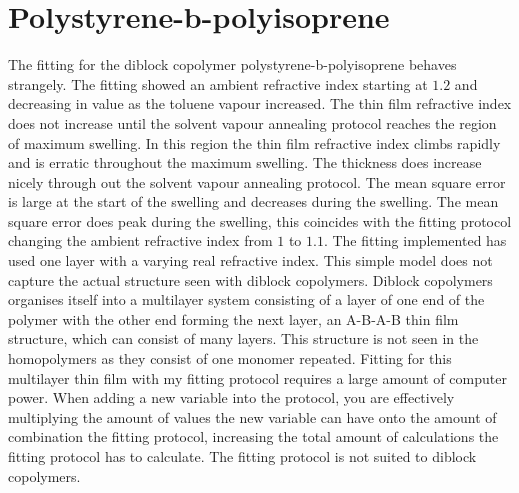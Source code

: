 \documentclass[MasterThesisMain.tex]{subfiles}
\begin{document}
\section{Polystyrene-b-polyisoprene}
The fitting for the diblock copolymer polystyrene-b-polyisoprene behaves strangely. The fitting showed an ambient refractive index starting at $1.2$ and decreasing in value as the toluene vapour increased. The thin film refractive index does not increase until the solvent vapour annealing protocol reaches the region of maximum swelling. In this region the thin film refractive index climbs rapidly and is erratic throughout the maximum swelling. The thickness does increase nicely through out the solvent vapour annealing protocol. The mean square error is large at the start of the swelling and decreases during the swelling. The mean square error does peak during the swelling, this coincides with the fitting protocol changing the ambient refractive index from $1$ to $1.1$. The fitting implemented has used one layer with a varying real refractive index. This simple model does not capture the actual structure seen with diblock copolymers. Diblock copolymers organises itself into a multilayer system consisting of a layer of one end of the polymer with the other end forming the next layer, an A-B-A-B thin film structure, which can consist of many layers. This structure is not seen in the homopolymers as they consist of one monomer repeated. Fitting for this multilayer thin film with my fitting protocol requires a large amount of computer power. When adding a new variable into the protocol, you are effectively multiplying the amount of values the new variable can have onto the amount of combination the fitting protocol, increasing the total amount of calculations the fitting protocol has to calculate. The fitting protocol is not suited to diblock copolymers.     
\end{document}
